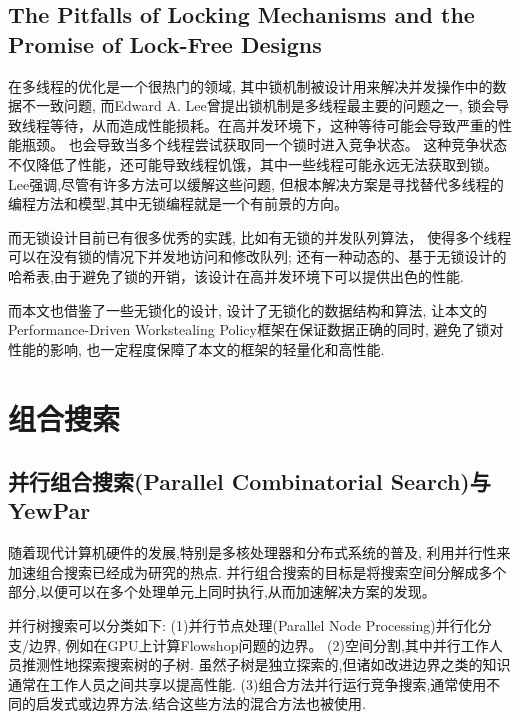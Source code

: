 \documentclass{mproj}
\begin{document}
\subsection{The Pitfalls of Locking Mechanisms and the Promise of Lock-Free Designs}\label{survey_lock}
在多线程的优化是一个很热门的领域,
其中锁机制被设计用来解决并发操作中的数据不一致问题,
而Edward A. Lee曾提出锁机制是多线程最主要的问题之一\cite{1631937},
锁会导致线程等待，从而造成性能损耗。在高并发环境下，这种等待可能会导致严重的性能瓶颈。
也会导致当多个线程尝试获取同一个锁时进入竞争状态。
这种竞争状态不仅降低了性能，还可能导致线程饥饿，其中一些线程可能永远无法获取到锁。
Lee强调,尽管有许多方法可以缓解这些问题,
但根本解决方案是寻找替代多线程的编程方法和模型,其中无锁编程就是一个有前景的方向。

而无锁设计目前已有很多优秀的实践,
比如有无锁的并发队列算法，
使得多个线程可以在没有锁的情况下并发地访问和修改队列\cite{10.1145/248052.248106};
还有一种动态的、基于无锁设计的哈希表,由于避免了锁的开销，该设计在高并发环境下可以提供出色的性能\cite{10.1145/564870.564881}.

而本文也借鉴了一些无锁化的设计,
设计了无锁化的数据结构和算法,
让本文的Performance-Driven Workstealing Policy框架在保证数据正确的同时,
避免了锁对性能的影响,
也一定程度保障了本文的框架的轻量化和高性能.


\section{组合搜索}

\subsection{并行组合搜索(Parallel Combinatorial Search)与YewPar}
随着现代计算机硬件的发展,特别是多核处理器和分布式系统的普及,
利用并行性来加速组合搜索已经成为研究的热点.
并行组合搜索的目标是将搜索空间分解成多个部分,以便可以在多个处理单元上同时执行,从而加速解决方案的发现。


并行树搜索可以分类\cite{gendron1994parallel}如下:
(1)并行节点处理(Parallel Node Processing)并行化分支/边界,
例如在GPU上计算Flowshop问题的边界\cite{gmys2016work}。
(2)空间分割,其中并行工作人员推测性地探索搜索树的子树.
虽然子树是独立探索的,但诸如改进边界之类的知识通常在工作人员之间共享以提高性能.
(3)组合方法并行运行竞争搜索,通常使用不同的启发式或边界方法.结合这些方法的混合方法也被使用.
\end{document}
